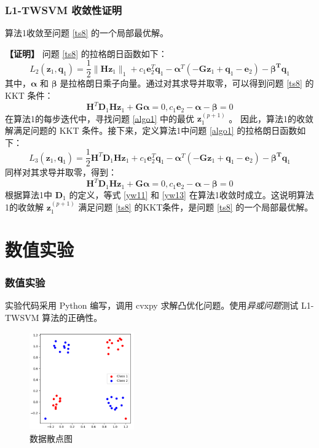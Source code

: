 \documentclass{beamer}
\begin{document}
\begin{frame}[allowframebreaks]
\frametitle{L1-TWSVM 收敛性证明}
\begin{theorem}
算法1收敛至问题 \eqref{ts8} 的一个局部最优解。
\end{theorem}

\textbf{【证明】}
问题 \eqref{ts8} 的拉格朗日函数如下：
\begin{equation}
L_{2}(\mathbf{z}_{1},\mathbf{q}_{1})=\frac{1}{2}\|\mathbf{Hz}_{1}\|_{1}+
c_{1}\mathbf{e}^{T}_{2}\mathbf{q}_{1}-\mathbf{\alpha}^{T}(-\mathbf{Gz}_{1}+\mathbf{q}_{1}-\mathbf{e}_{2})
-\mathbf{\beta^{T}q}_{1}
\label{yw10}
\end{equation}
其中，$\mathbf{\alpha}$ 和 $\mathbf{\beta}$ 是拉格朗日乘子向量。通过对其求导并取零，可以得到问题 \eqref{ts8} 的 KKT 条件：
\begin{equation}
\mathbf{H}^{T}\mathbf{D}_{1}\mathbf{Hz}_{1}+\mathbf{G\alpha}=0,
c_{1}\mathbf{e}_{2}-\mathbf{\alpha}-\mathbf{\beta}=0
\label{yw11}
\end{equation}
在算法1的每步迭代中，寻找问题 \eqref{algo1} 中的最优 $\mathbf{z}^{(p+1)}_{1}$ 。
因此，算法1的收敛解满足问题的 KKT 条件。接下来，定义算法1中问题 \eqref{algo1} 的拉格朗日函数如下：
\begin{equation}
L_{3}(\mathbf{z}_{1},\mathbf{q}_{1})=\frac{1}{2}\mathbf{H}^{T}\mathbf{D}_{1}\mathbf{Hz}_{1}+
c_{1}\mathbf{e}^{T}_{2}\mathbf{q}_{1}-\mathbf{\alpha}^{T}(-\mathbf{Gz}_{1}+\mathbf{q}_{1}-\mathbf{e}_{2})
-\mathbf{\beta^{T}q}_{1}
\label{yw12}
\end{equation}
同样对其求导并取零，得到：
\begin{equation}
\mathbf{H}^{T}\mathbf{D}_{1}\mathbf{Hz}_{1}+\mathbf{G\alpha}=0,
c_{1}\mathbf{e}_{2}-\mathbf{\alpha}-\mathbf{\beta}=0
\label{yw13}
\end{equation}
根据算法1中 $\mathbf{D}_{1}$ 的定义，等式 \eqref{yw11} 和 \eqref{yw13} 在算法1收敛时成立。这说明算法1的收敛解 $\mathbf{z}^{(p+1)}_{1}$ 满足问题 \eqref{ts8} 的KKT条件，是问题 \eqref{ts8} 的一个局部最优解。
\end{frame}


\section{数值实验}

\begin{frame}
\frametitle{数值实验}
实验代码采用 Python 编写，调用 cvxpy \parencite{cvxpy} 求解凸优化问题。使用\emph{异或问题}测试 L1-TWSVM 算法的正确性。
\begin{figure}[ht]
\centering
\includegraphics[width=0.4\textwidth]{../img/datas.png}
\caption{数据散点图}
\label{data_points}
\end{figure}
\end{frame}
\end{document}

